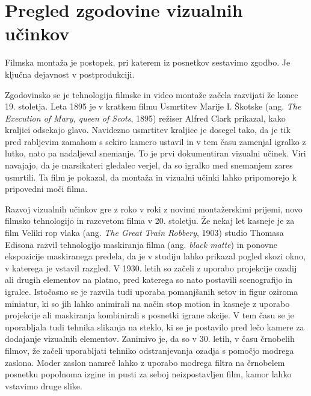 \documentclass[a4paper, 12pt]{book}
\begin{document}
\section{Pregled zgodovine vizualnih učinkov}

Filmska montaža je postopek, pri katerem iz posnetkov sestavimo zgodbo. 
Je ključna dejavnost v postprodukciji. 

Zgodovinsko se je tehnologija filmske in video montaže začela razvijati že konec 19. stoletja. 
Leta 1895 je v kratkem filmu Usmrtitev Marije I. Škotske (ang. {\it The Execution of Mary, queen of Scots}, 1895) režiser Alfred Clark prikazal, kako kraljici odsekajo glavo. 
Navidezno usmrtitev kraljice je dosegel tako, da je tik pred rabljevim zamahom s sekiro kamero ustavil in v tem času zamenjal igralko z lutko, nato pa nadaljeval snemanje. 
To je prvi dokumentiran vizualni učinek. 
Viri navajajo, da je marsikateri gledalec verjel, da so igralko med snemanjem zares usmrtili. %
Ta film je pokazal, da montaža in vizualni učinki lahko pripomorejo k pripovedni moči filma.

Razvoj vizualnih učinkov gre z roko v roki z novimi montažerskimi prijemi, novo filmsko tehnologijo in razcvetom filma v 20. stoletju. 
Že nekaj let kasneje je za film Veliki rop vlaka (ang. {\it The Great Train Robbery}, 1903) studio Thomasa Edisona razvil tehnologijo maskiranja filma (ang. {\it black matte}) in ponovne ekspozicije maskiranega predela, da je v studiju lahko prikazal pogled skozi okno, v katerega je vstavil razgled. 
V 1930. letih so začeli z uporabo projekcije ozadij ali drugih elementov na platno, pred katerega so nato postavili scenografijo in igralce. 
Istočasno se je razvila tudi uporaba pomanjšanih setov in figur oziroma miniatur, ki so jih lahko animirali na način stop motion in kasneje z uporabo projekcije ali maskiranja kombinirali s posnetki igrane akcije.%
V tem času se je uporabljala tudi tehnika slikanja na steklo, ki se je postavilo pred lečo kamere za dodajanje vizualnih elementov. 
Zanimivo je, da so v 30. letih, v času črnobelih filmov, že začeli uporabljati tehniko odstranjevanja ozadja s pomočjo modrega zaslona. 
Moder zaslon namreč lahko z uporabo modrega filtra na črnobelem posnetku popolnoma izgine in pusti za seboj neizpostavljen film, kamor lahko vstavimo druge slike. 
\end{document}

